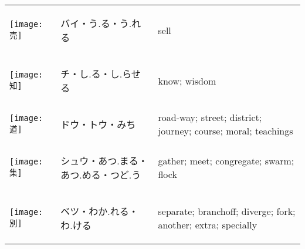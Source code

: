 \documentclass[a4paper,12pt]{extarticle}
\begin{document}
\begin{longtable}{|lp{6cm}p{4cm}|}
\begin{minipage}{0.3\textwidth}
\centerline{
	\texttt{[image: 売]}
}
\end{minipage}
&
\begin{CJK}{UTF8}{min}バイ・う.る・う.れる\end{CJK}
&
sell
\\ 
\begin{minipage}{0.3\textwidth}
\centerline{
	\texttt{[image: 知]}
}
\end{minipage}
&
\begin{CJK}{UTF8}{min}チ・し.る・し.らせる\end{CJK}
&
know; wisdom
\\ 
\begin{minipage}{0.3\textwidth}
\centerline{
	\texttt{[image: 道]}
}
\end{minipage}
&
\begin{CJK}{UTF8}{min}ドウ・トウ・みち\end{CJK}
&
road-way; street; district; journey; course; moral; teachings
\\ 
\begin{minipage}{0.3\textwidth}
\centerline{
	\texttt{[image: 集]}
}
\end{minipage}
&
\begin{CJK}{UTF8}{min}シュウ・あつ.まる・あつ.める・つど.う\end{CJK}
&
gather; meet; congregate; swarm; flock
\\ 
\begin{minipage}{0.3\textwidth}
\centerline{
	\texttt{[image: 別]}
}
\end{minipage}
&
\begin{CJK}{UTF8}{min}ベツ・わか.れる・わ.ける\end{CJK}
&
separate; branchoff; diverge; fork; another; extra; specially

\end{longtable}
\end{document}
